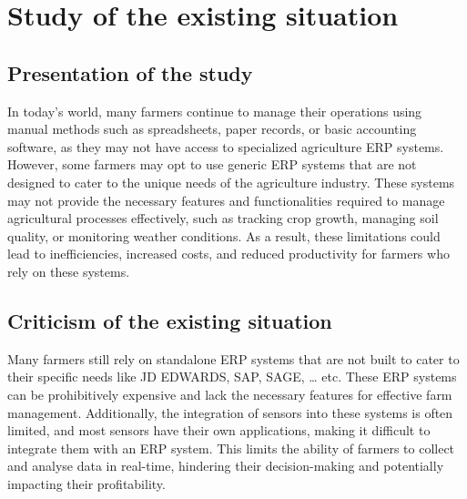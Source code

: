 \section{Study of the existing situation}
\subsection{Presentation of the study}
In today's world, many farmers continue to manage their operations using manual methods such as spreadsheets, paper records, or basic accounting software, as they may not have access to specialized agriculture ERP systems. However, some farmers may opt to use generic ERP systems that are not designed to cater to the unique needs of the agriculture industry. These systems may not provide the necessary features and functionalities required to manage agricultural processes effectively, such as tracking crop growth, managing soil quality, or monitoring weather conditions. As a result, these limitations could lead to inefficiencies, increased costs, and reduced productivity for farmers who rely on these systems.
\subsection{Criticism of the existing situation }
Many farmers still rely on standalone ERP systems that are not built to cater to their specific needs like JD EDWARDS, SAP, SAGE, … etc.
 These ERP systems can be prohibitively expensive and lack the necessary features for effective farm management. Additionally, the integration of sensors into these systems is often limited, and most sensors have their own applications, making it difficult to integrate them with an ERP system. This limits the ability of farmers to collect and analyse data in real-time, hindering their decision-making and potentially impacting their profitability.
